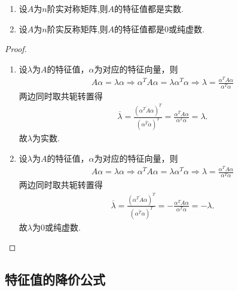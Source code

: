 \documentclass[../../main.tex]{subfiles}%
\begin{document}
\begin{proposition}\label{proposition:实对称(反称)阵的特征值}
\begin{enumerate}
\item 设$A$为$n$阶实对称矩阵,则$A$的特征值都是实数.

\item 设$A$为$n$阶实反称矩阵,则$A$的特征值都是0或纯虚数.
\end{enumerate}
\end{proposition}
\begin{proof}
\begin{enumerate}
\item 设$\lambda$为$A$的特征值，$\alpha$为对应的特征向量，则
\begin{align*}
A\alpha = \lambda \alpha \Longrightarrow \alpha^T A\alpha = \lambda \alpha^T \alpha \Longrightarrow \lambda = \frac{\alpha^T A\alpha}{\alpha^T \alpha}
\end{align*}
两边同时取共轭转置得
\begin{align*}
\overline{\lambda} = \frac{\left( \overline{\alpha^T A\alpha} \right)^T}{\left( \overline{\alpha^T \alpha} \right)^T} = \frac{\alpha^T A\alpha}{\alpha^T \alpha} = \lambda.
\end{align*}
故$\lambda$为实数.

\item 设$\lambda$为$A$的特征值，$\alpha$为对应的特征向量，则
\begin{align*}
A\alpha = \lambda \alpha \Longrightarrow \alpha^T A\alpha = \lambda \alpha^T \alpha \Longrightarrow \lambda = \frac{\alpha^T A\alpha}{\alpha^T \alpha}
\end{align*}
两边同时取共轭转置得
\begin{align*}
\overline{\lambda} = \frac{\left( \overline{\alpha^T A\alpha} \right)^T}{\left( \overline{\alpha^T \alpha} \right)^T} = -\frac{\alpha^T A\alpha}{\alpha^T \alpha} = -\lambda.
\end{align*}
故$\lambda$为$0$或纯虚数.
\end{enumerate}
\end{proof}


\subsection{特征值的降价公式}
\end{document}
